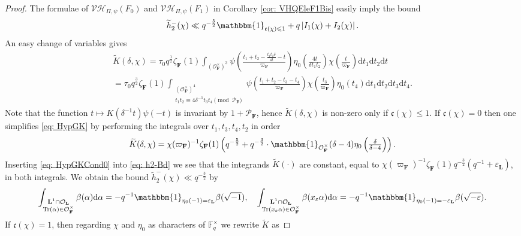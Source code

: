 \documentclass[A4]{amsart}
\def\leq{\leqslant}
\numberwithin{equation}{section} \everymath{\displaystyle}
\newcommand{\Tr}{{\rm Tr}}
\newcommand{\id}{\mathbbm{1}}
\newcommand{\ud}{\mathrm{d}}
\newcommand{\F}{\mathbf{F}}
\newcommand{\fF}{\mathbb{F}}
\newcommand{\bL}{\mathbf{L}}
\newcommand{\vO}{\mathcal{O}}
\newcommand{\vP}{\mathcal{P}}
\newcommand{\extnorm}[1]{\left\lvert #1 \right\rvert}
\newcommand{\VorH}{\mathcal{VH}}
\newcommand{\cond}{\mathfrak{c}}
\begin{document}
\begin{proof}
	The formulae of $\VorH_{\Pi,\psi}(F_0)$ and $\VorH_{\Pi,\psi}(F_1)$ in Corollary \ref{cor: VHQEleF1Bis} easily imply the bound
\begin{equation} \label{eq: h2-Bd}
	\widetilde{h}_2^-(\chi) \ll q^{-\frac{5}{2}} \id_{\cond(\chi) \leq 1} + q \extnorm{I_1(\chi) + I_2(\chi)}.
\end{equation}
	An easy change of variables gives
\begin{multline} \label{eq: HypGK}
	\widetilde{K}(\delta, \chi) = \tau_0 q^{\frac{1}{2}} \zeta_{\F}(1) \int_{(\vO_{\F}^{\times})^3} \psi \left( \tfrac{t_1+t_2 - \frac{t_1t_2 \delta}{4t} - t}{\varpi_{\F}} \right) \eta_0 \left( \tfrac{4t}{\delta t_1t_2} \right) \chi \left( \tfrac{t}{\varpi_{\F}} \right) \ud t_1 \ud t_2 \ud t  \\
	= \tau_0 q^{\frac{3}{2}} \zeta_{\F}(1) \int_{\substack{(\vO_{\F}^{\times})^4 \\ t_1t_2 \equiv 4 \delta^{-1} t_3t_4 \pmod{\vP_{\F}}}} \psi \left( \tfrac{t_1+t_2-t_3-t_4}{\varpi_{\F}} \right) \chi \left( \tfrac{t_3}{\varpi_{\F}} \right) \eta_0(t_4) \ud t_1 \ud t_2 \ud t_3 \ud t_4.
\end{multline}
	Note that the function $t \mapsto K(\delta^{-1}t)\psi(-t)$ is invariant by $1+\vP_{\F}$, hence $\widetilde{K}(\delta,\chi)$ is non-zero only if $\cond(\chi) \leq 1$. If $\cond(\chi)=0$ then one simplifies \eqref{eq: HypGK} by performing the integrals over $t_1, t_3, t_4, t_2$ in order
\begin{equation} \label{eq: HypGKCond0}
	\widetilde{K}(\delta, \chi) = \chi(\varpi_{\F})^{-1} \zeta_{\F}(1) \left( q^{-\frac{5}{2}} + q^{-\frac{3}{2}} \cdot \id_{\vO_{\F}^{\times}}(\delta - 4) \eta_0 \left( \tfrac{\delta}{\delta - 4} \right) \right). 
\end{equation}
	Inserting \eqref{eq: HypGKCond0} into \eqref{eq: h2-Bd} we see that the integrands $\widetilde{K}(\cdot)$ are constant, equal to $\chi(\varpi_{\F})^{-1} \zeta_{\F}(1) q^{-\frac{3}{2}} (q^{-1} + \varepsilon_{\bL})$, in both integrals. We obtain the bound $\widetilde{h}_2^-(\chi) \ll q^{-\frac{3}{2}}$ by
	$$ \int_{\substack{\bL^1 \cap \vO_{\bL} \\ \Tr(\alpha) \in \vO_{\F}^{\times}}} \beta(\alpha) \ud \alpha = - q^{-1} \id_{\eta_0(-1)=\varepsilon_{\bL}} \beta(\sqrt{-1}), \quad \int_{\substack{\bL^1 \cap \vO_{\bL} \\ \Tr(x_{\varepsilon} \alpha) \in \vO_{\F}^{\times}}} \beta(x_{\varepsilon} \alpha) \ud \alpha = - q^{-1 }\id_{\eta_0(-1)=-\varepsilon_{\bL}} \beta(\sqrt{-\varepsilon}). $$
	If $\cond(\chi)=1$, then regarding $\chi$ and $\eta_0$ as characters of $\fF_q^{\times}$ we rewrite $\widetilde{K}$ as

\end{proof}
\end{document}
